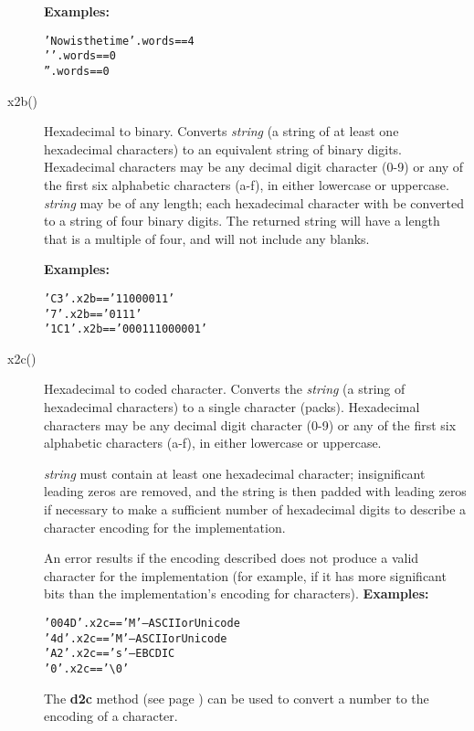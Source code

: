 \begin{description}
\textbf{Examples:}
\begin{alltt}
'Now is the time'.words == 4
' '.words               == 0
''.words                == 0
\end{alltt}

\item[x2b()]\label{refx2b}
Hexadecimal to binary.
Converts \emph{string} (a string of at least one hexadecimal
characters) to an equivalent string of binary digits.
Hexadecimal characters may be any decimal digit character (0-9) or any
of the first six alphabetic characters (a-f), in either lowercase or
uppercase.
 \emph{string} may be of any length; each hexadecimal character
with be converted to a string of four binary digits.
The returned string will have a length that is a multiple of four, and
will not include any blanks.
 
\textbf{Examples:}
\begin{alltt}
'C3'.x2b  == '11000011'
'7'.x2b   == '0111'
'1C1'.x2b == '000111000001'
\end{alltt}

\item[x2c()]\label{refx2c}
Hexadecimal to coded character.
Converts the \emph{string} (a string of hexadecimal characters) to
a single character (packs).
Hexadecimal characters may be any decimal digit character (0-9) or any
of the first six alphabetic characters (a-f), in either lowercase or
uppercase.
 
\emph{string} must contain at least one hexadecimal character;
insignificant leading zeros are removed, and the string is then padded
with leading zeros if necessary to make a sufficient number of
hexadecimal digits to describe a character encoding for the
implementation.
 
An error results if the encoding described does not produce a valid
character for the implementation (for example, if it has more
significant bits than the implementation's encoding for characters).
 \textbf{Examples:}
\begin{alltt}
'004D'.x2c == 'M' -- ASCII or Unicode
'4d'.x2c   == 'M' -- ASCII or Unicode
'A2'.x2c   == 's' -- EBCDIC
'0'.x2c    == '\textbackslash 0'
\end{alltt}
 The  \textbf{d2c} method (see page \pageref{refd2c})  can be used to
convert a \nr{} number to the encoding of a character.


\end{description}
